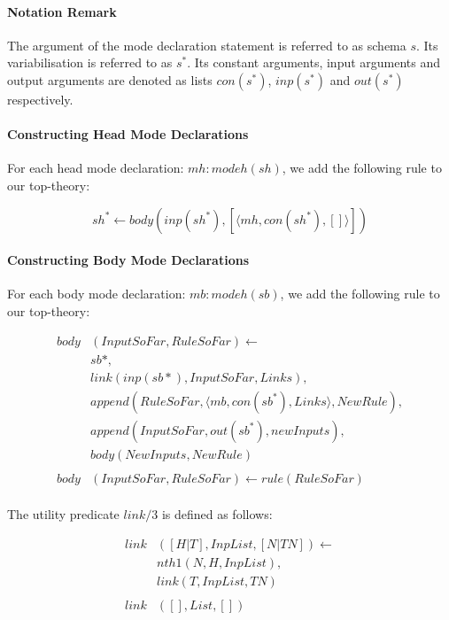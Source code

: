 \documentclass{article}
\theoremstyle{plain}
\theoremstyle{definition}
\begin{document}
\begin{multicols}{2}
\paragraph{Notation Remark} The argument of the mode declaration statement is referred to as schema $s$. Its variabilisation is referred to as $s^*$. Its constant arguments, input arguments and output arguments are denoted as lists $con(s^*)$, $inp(s^*)$ and $out(s^*)$ respectively.

\paragraph{Constructing Head Mode Declarations} For each head mode declaration: $mh: modeh(sh)$, we add the following rule to our top-theory:

$$sh^* \leftarrow body(inp(sh^*), [\langle mh, con(sh^*), [] \rangle])$$


\paragraph{Constructing Body Mode Declarations} For each body mode declaration: $mb: modeh(sb)$, we add the following rule to our top-theory:

{\footnotesize
\begin{align*}
body&(InputSoFar, RuleSoFar) \leftarrow\\
& sb*,\\
& link(inp(sb*), InputSoFar, Links),\\
& append(RuleSoFar, \langle mb, con(sb^*), Links\rangle, NewRule),\\
& append(InputSoFar, out(sb^*), newInputs),\\
& body(NewInputs, NewRule)\\
\\
body&(InputSoFar, RuleSoFar) \leftarrow rule(RuleSoFar)
\end{align*}
}

\paragraph{} The utility predicate $link/3$ is defined as follows:

\begin{align*}
link&([H|T], InpList, [N|TN]) \leftarrow\\
& nth1(N, H, InpList),\\
& link(T, InpList, TN)\\
\\
link&([], List, [])
\end{align*}


\end{multicols}
\end{document}
